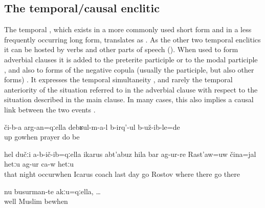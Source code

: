 
\subsection{The temporal/causal enclitic  }
\label{sec:enclitic =qella}

The temporal , which exists in a more commonly used short form and in a less frequently occurring long form, translates as . As the other two temporal enclitics it can be hosted by verbs and other parts of speech (). When used to form adverbial clauses it is added to the preterite participle  or to the modal participle , and also to forms of the negative copula (usually the participle, but also other forms) . It expresses the temporal simultaneity , and rarely the temporal anteriority  of the situation referred to in the adverbial clause with respect to the situation described in the main clause. In many cases, this also implies a causal link between the two events .
%

\begin{exe}
	\ex	\label{ex:‎When they went up there they were praying}
	\gll	či-b-a	arg-an=qːella		debʁul-m-a-l	b-irq'-ul	b-už-ib-le=de\\
		up	gowhen	prayer	do	be\\
	\glt	{}

	\ex	\label{ex:‎When / after / because at that night}
	\gll	hel	dučːi	a-b-ič-ib=qːella	ikarus	abt'abuz	hila	bar	ag-ur-re	Rast'aw=uw	čina=jal	hetːu	ag-ur	ca-w	hetːu\\
		that	night	occurwhen	Icarus	coach	last	day	go	Rostov	where	there	go		there\\
	\glt	{}

	\ex	\label{ex:Well because (they) were not Muslims}
	\gll	nu	busurman-te	akːu=qːella,	\ldots\\
		well	Muslim 	bewhen\\
	\glt	{}
\end{exe}


